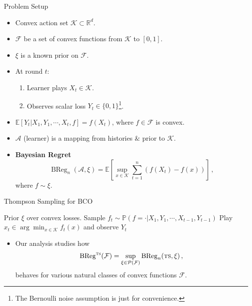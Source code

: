 \documentclass{beamer}
\newcommand{\BReg}{\operatorname{BReg}}
\newcommand{\E}{\mathbb{E}}
\newcommand{\PP}{\mathbb{P}}
\newcommand{\cK}{\mathcal{K}}
\newcommand{\cF}{\mathcal{F}}
\newcommand{\cA}{\mathcal{A}}
\newcommand{\cP}{\mathcal{P}}
\newcommand{\ts}{{\textsc{ts}}}
\begin{document}
\begin{frame}{Problem Setup}
    \begin{itemize}
        \item Convex action set \( \cK \subset \mathbb{R}^d \).
        \item $\cF$ be a set of convex functions from $\cK$ to $[0,1]$.
        \item $\xi$ is a known prior on $\cF$.
        \item<2-> At round \(t\):
              \begin{enumerate}
                  \item Learner plays \(X_t \in \cK\).
                  \item Observes scalar loss \( Y_t \in \{0,1\}\)\footnote{The Bernoulli noise assumption is just for convenience.}.
              \end{enumerate}
        \item<3-> $\E\left[Y_t|X_1, Y_1, \cdots, X_t, f\right] = f(X_t)$, where $f \in \cF$ is convex.
        \item<4-> $\cA$ (learner) is a mapping from histories $\&$ prior to $\cK$.
        \item<5-> \textbf{Bayesian Regret}
              \[
                  \BReg_n(\cA, \xi) =
                  \E\left[
                      \sup_{x \in \cK}
                      \sum_{t=1}^n (f(X_t) - f(x))
                      \right]\,,
              \]
              where $f\sim \xi$.
    \end{itemize}
\end{frame}

\begin{frame}{Thompson Sampling for BCO}
    \begin{algorithm}[H]
        \caption{Thompson Sampling}
        \begin{algorithmic}[1]
            \State Prior \( \xi \) over convex losses.
            \State Sample \(f_t \sim \PP(f=\cdot|X_1, Y_1, \cdots, X_{t-1}, Y_{t-1})\)
            \State Play \( x_t \in \arg\min_{x\in\cK} f_t(x) \) and observe $Y_t$
            \EndFor
        \end{algorithmic}
    \end{algorithm}
    \begin{itemize}
        \item Our analysis studies how
              \[
                  \BReg^{\ts}(\cF) = \sup_{\xi \in \cP(\cF)} \BReg_n(\ts, \xi)\,,
              \]
              behaves for various natural classes of convex functions $\cF$.
    \end{itemize}
\end{frame}
\end{document}
